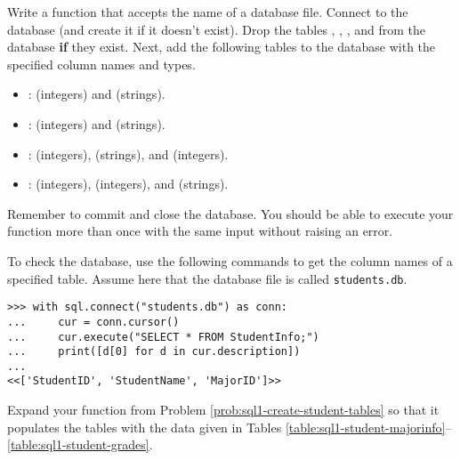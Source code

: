 Write a function that accepts the name of a database file.
Connect to the database (and create it if it doesn't exist).
Drop the tables , , , and  from the database \textbf{if} they exist.
Next, add the following tables to the database with the specified column names and types.
\begin{itemize}
\item {}:  (integers) and  (strings).
\item {}:  (integers) and  (strings).
\item {}:  (integers),  (strings), and  (integers).
\item {}:  (integers),  (integers), and  (strings).
\end{itemize}
Remember to commit and close the database.
You should be able to execute your function more than once with the same input without raising an error.

To check the database, use the following commands to get the column names of a specified table.
Assume here that the database file is called \texttt{students.db}.

\begin{lstlisting}
>>> with sql.connect("students.db") as conn:
...     cur = conn.cursor()
...     cur.execute("SELECT * FROM StudentInfo;")
...     print([d[0] for d in cur.description])
...
<<['StudentID', 'StudentName', 'MajorID']>>
\end{lstlisting}
\label{prob:sql1-create-student-tables}
Expand your function from Problem \ref{prob:sql1-create-student-tables} so that it populates the tables with the data given in Tables \ref{table:sql1-student-majorinfo}--\ref{table:sql1-student-grades}.

